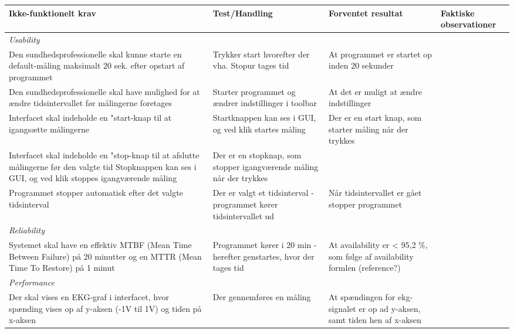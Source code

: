 \begin{longtabu} to 
    Ikke-funktionelt krav &    Test/Handling & Forventet resultat &		Faktiske observationer\\[-1ex]
    \midrule
    \textit{Usability} & ~ & ~ & ~ 
    \\ \midrule
    	Den sundhedsprofessionelle skal kunne starte en default-måling maksimalt 20 sek. efter opstart af programmet &
        Trykker start hvorefter der vha. Stopur tages tid  &    
        At programmet er startet op inden 20 sekunder &	
        ~ 	%
    \\
    	Den sundhedsprofessionelle skal have mulighed for at ændre tidsintervallet før målingerne foretages &
        Starter programmet og ændrer indstillinger i toolbar  &    
        At det er muligt at ændre indstillinger &	
        ~ 		%
    \\
		Interfacet skal indeholde en "start-knap til at igangsætte målingerne &
		Startknappen kan ses i GUI, og ved klik startes måling &
		Der er en start knap, som starter måling når der trykkes &
		~ 		%
	\\
		Interfacet skal indeholde en "stop-knap til at afslutte målingerne før den valgte tid
		Stopknappen kan ses i GUI, og ved klik stoppes igangværende måling &
		Der er en stopknap, som stopper igangværende måling når der trykkes &
		~ 		%
	\\
		Programmet stopper automatisk efter det valgte tidsinterval &
		Der er valgt et tidsinterval - programmet kører tidsintervallet ud &
		Når tidsintervallet er gået stopper programmet &
		~ 	%
		\\ \midrule	
    \textit{Reliability} & ~ & ~ & ~ 
    \\ \midrule
    	Systemet skal have en effektiv MTBF (Mean Time Between Failure) på 20 minutter og en MTTR (Mean Time To Restore) på 1 minut &
    	Programmet kører i 20 min - herefter genstartes, hvor der tages tid &
    	At availability er < 95,2 \%, som følge af availability formlen (reference?) &
    \\ \midrule	
  	\textit{Performance} & ~ & ~ & ~
    \\ \midrule
    	Der skal vises en EKG-graf i interfacet, hvor spænding vises op af y-aksen (-1V til 1V) og tiden på x-aksen &
    	Der gennemføres en måling &
    	At spændingen for ekg-signalet er op ad y-aksen, samt tiden hen af x-aksen &

\end{longtabu}
